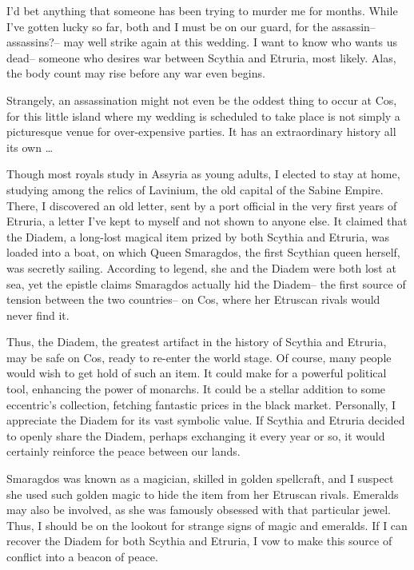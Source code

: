 \documentclass[char]{Kos}
\begin{document}
I'd bet anything that someone has been trying to murder me for months. While I've gotten lucky so far, both \cBride{} and I must be on our guard, for the assassin-- assassins?-- may well strike again at this wedding. I want to know who wants us dead-- someone who desires war between Scythia and Etruria, most likely. Alas, the body count may rise before any war even begins. 

Strangely, an assassination might not even be the oddest thing to occur at Cos, for this little island where my wedding is scheduled to take place is not simply a picturesque venue for over-expensive parties. It has an extraordinary history all its own \ldots

Though most royals study in Assyria as young adults, I elected to stay at home, studying among the relics of Lavinium, the old capital of the Sabine Empire. There, I discovered an old letter, sent by a port official in the very first years of Etruria, a letter I've kept to myself and not shown to anyone else. It claimed that the Diadem, a long-lost magical item prized by both Scythia and Etruria, was loaded into a boat, on which Queen Smaragdos, the first Scythian queen herself, was secretly sailing. According to legend, she and the Diadem were both lost at sea, yet the epistle claims Smaragdos actually hid the Diadem-- the first source of tension between the two countries-- on Cos, where her Etruscan rivals would never find it.

Thus, the Diadem, the greatest artifact in the history of Scythia and Etruria, may be safe on Cos, ready to re-enter the world stage. Of course, many people would wish to get hold of such an item. It could make for a powerful political tool, enhancing the power of monarchs. It could be a stellar addition to some eccentric's collection, fetching fantastic prices in the black market. Personally, I appreciate the Diadem for its vast symbolic value. If Scythia and Etruria decided to openly share the Diadem, perhaps exchanging it every year or so, it would certainly reinforce the peace between our lands.

Smaragdos was known as a magician, skilled in golden spellcraft, and I suspect she used such golden magic to hide the item from her Etruscan rivals. Emeralds may also be involved, as she was famously obsessed with that particular jewel. Thus, I should be on the lookout for strange signs of magic and emeralds. If I can recover the Diadem for both Scythia and Etruria, I vow to make this source of conflict into a beacon of peace. 
\end{document}
